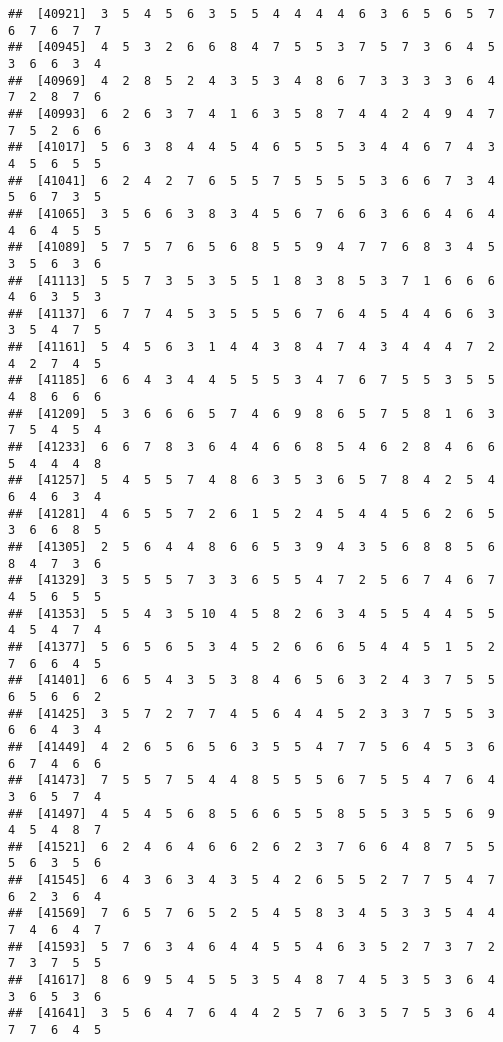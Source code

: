 \documentclass[
]{book}
\begin{document}
\begin{verbatim}
##  [40921]  3  5  4  5  6  3  5  5  4  4  4  4  6  3  6  5  6  5  7  6  7  6  7  7
##  [40945]  4  5  3  2  6  6  8  4  7  5  5  3  7  5  7  3  6  4  5  3  6  6  3  4
##  [40969]  4  2  8  5  2  4  3  5  3  4  8  6  7  3  3  3  3  6  4  7  2  8  7  6
##  [40993]  6  2  6  3  7  4  1  6  3  5  8  7  4  4  2  4  9  4  7  7  5  2  6  6
##  [41017]  5  6  3  8  4  4  5  4  6  5  5  5  3  4  4  6  7  4  3  4  5  6  5  5
##  [41041]  6  2  4  2  7  6  5  5  7  5  5  5  5  3  6  6  7  3  4  5  6  7  3  5
##  [41065]  3  5  6  6  3  8  3  4  5  6  7  6  6  3  6  6  4  6  4  4  6  4  5  5
##  [41089]  5  7  5  7  6  5  6  8  5  5  9  4  7  7  6  8  3  4  5  3  5  6  3  6
##  [41113]  5  5  7  3  5  3  5  5  1  8  3  8  5  3  7  1  6  6  6  4  6  3  5  3
##  [41137]  6  7  7  4  5  3  5  5  5  6  7  6  4  5  4  4  6  6  3  3  5  4  7  5
##  [41161]  5  4  5  6  3  1  4  4  3  8  4  7  4  3  4  4  4  7  2  4  2  7  4  5
##  [41185]  6  6  4  3  4  4  5  5  5  3  4  7  6  7  5  5  3  5  5  4  8  6  6  6
##  [41209]  5  3  6  6  6  5  7  4  6  9  8  6  5  7  5  8  1  6  3  7  5  4  5  4
##  [41233]  6  6  7  8  3  6  4  4  6  6  8  5  4  6  2  8  4  6  6  5  4  4  4  8
##  [41257]  5  4  5  5  7  4  8  6  3  5  3  6  5  7  8  4  2  5  4  6  4  6  3  4
##  [41281]  4  6  5  5  7  2  6  1  5  2  4  5  4  4  5  6  2  6  5  3  6  6  8  5
##  [41305]  2  5  6  4  4  8  6  6  5  3  9  4  3  5  6  8  8  5  6  8  4  7  3  6
##  [41329]  3  5  5  5  7  3  3  6  5  5  4  7  2  5  6  7  4  6  7  4  5  6  5  5
##  [41353]  5  5  4  3  5 10  4  5  8  2  6  3  4  5  5  4  4  5  5  4  5  4  7  4
##  [41377]  5  6  5  6  5  3  4  5  2  6  6  6  5  4  4  5  1  5  2  7  6  6  4  5
##  [41401]  6  6  5  4  3  5  3  8  4  6  5  6  3  2  4  3  7  5  5  6  5  6  6  2
##  [41425]  3  5  7  2  7  7  4  5  6  4  4  5  2  3  3  7  5  5  3  6  6  4  3  4
##  [41449]  4  2  6  5  6  5  6  3  5  5  4  7  7  5  6  4  5  3  6  6  7  4  6  6
##  [41473]  7  5  5  7  5  4  4  8  5  5  5  6  7  5  5  4  7  6  4  3  6  5  7  4
##  [41497]  4  5  4  5  6  8  5  6  6  5  5  8  5  5  3  5  5  6  9  4  5  4  8  7
##  [41521]  6  2  4  6  4  6  6  2  6  2  3  7  6  6  4  8  7  5  5  5  6  3  5  6
##  [41545]  6  4  3  6  3  4  3  5  4  2  6  5  5  2  7  7  5  4  7  6  2  3  6  4
##  [41569]  7  6  5  7  6  5  2  5  4  5  8  3  4  5  3  3  5  4  4  7  4  6  4  7
##  [41593]  5  7  6  3  4  6  4  4  5  5  4  6  3  5  2  7  3  7  2  7  3  7  5  5
##  [41617]  8  6  9  5  4  5  5  3  5  4  8  7  4  5  3  5  3  6  4  3  6  5  3  6
##  [41641]  3  5  6  4  7  6  4  4  2  5  7  6  3  5  7  5  3  6  4  7  7  6  4  5

\end{verbatim}
\end{document}
